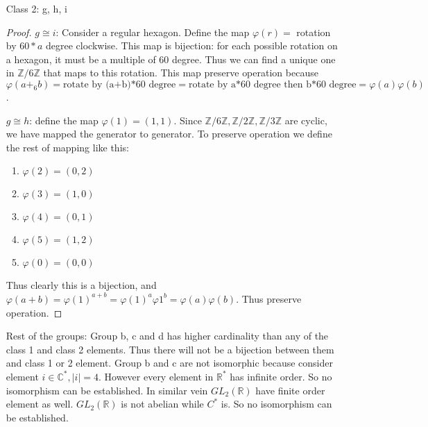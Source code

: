 \documentclass[11pt, oneside]{article}
\newcommand{\Z}{\mathbb Z}
\newcommand{\C}{\mathbb C}
\newcommand{\R}{\mathbb R}
\begin{document}
\begin{enumerate}
\begin{enumerate}
\begin{proof}
    Define $a\in \Z \mapsto 6a \in 6\Z$. This map is bijection because for each $6a\in 6\Z$, we have $a$ to map to it and a is unique since division by integer is injective. It also preserve operation because $a+b\mapsto 6a+6b$ while $a\mapsto 6a,  b\mapsto 6b$ for arbitrary $a,b \in \Z$
    
    $a\cong f$ because of the transitivity of isomorphism. Thus we have evaluated group 1.
    
    Group 1 is disjoint from other groups because they are the only groups that are countably infinite.
    
    \end{proof}
    
    \item[Class 2:] g, h, i
    \begin{proof}
    $g\cong i$: Consider a regular hexagon. Define the map $\varphi(r)=$ rotation by $60*a$ degree clockwise. This map is bijection: for each possible rotation on a hexagon, it must be a multiple of 60 degree. Thus we can find a unique one in $\Z/6\Z$ that maps to this rotation. This map preserve operation because $\varphi(a+_6b)=\text{rotate by (a+b)*60 degree}=\text{rotate by a*60 degree then b*60 degree}=\varphi(a)\varphi(b)$.
    
    $g\cong h$: define the map $\varphi(1)=(1,1)$. Since $\Z/6\Z, \Z/2\Z, \Z/3\Z$ are cyclic, we have mapped the generator to generator. To preserve operation we define the rest of mapping like this:
    
    \begin{enumerate}
        \item $\varphi(2)=(0,2)$
        \item $\varphi(3)=(1,0)$
        \item $\varphi(4)=(0,1)$
        \item $\varphi(5)=(1,2)$
        \item $\varphi(0)=(0,0)$
        
    \end{enumerate}
    Thus clearly this is a bijection, and $\varphi(a+b)=\varphi(1)^{a+b}=\varphi(1)^a\varphi{1}^b=\varphi(a)\varphi(b)$. Thus preserve operation.
    \end{proof}
    
    \item[Rest of the groups:] Group b, c  and d has higher cardinality than any of the class 1 and class 2 elements. Thus there will not be a bijection between them and class 1 or 2 element. Group b and c are not isomorphic because consider element $i\in \C^*, |i|=4$. However every element in $\R^*$ has infinite order. So no isomorphism can be established. In similar vein $GL_2(\R)$ have finite order element as well. $GL_2(\R)$ is not abelian while $C^*$ is. So no isomorphism can be established. 
    

\end{enumerate}
\end{enumerate}
\end{document}
